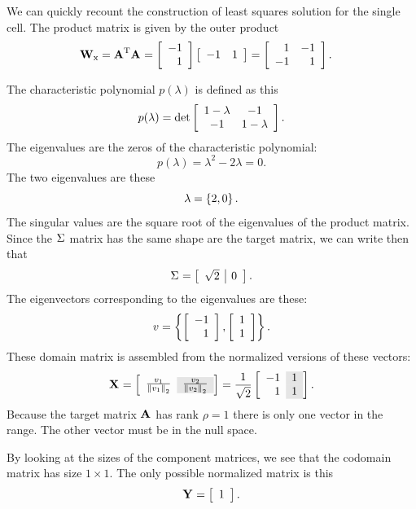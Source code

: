 We can quickly recount the construction of least squares solution for the single cell. The product matrix is given by the outer product
\begin{equation}
  \begin{split}
    \W{x} & = \A{T}\A{} = \mat{r}{-1\\1}\mat{rr}{-1&1} = 
    \mat{rr}{1&-1\\-1&1}.
  \end{split}
\end{equation}

The characteristic polynomial $p(\lambda)$ is defined as this
\begin{equation}
  p(\lambda) = \det
  \mat{cc}{1-\lambda&-1\\-1&1-\lambda}.
\end{equation}
The eigenvalues are the zeros of the characteristic polynomial:
\begin{equation}
  p(\lambda) = \lambda^{2} - 2\lambda = 0.
\end{equation}
The two eigenvalues are these
\begin{equation}
  \lambda = \lst{2,0}.
\end{equation}
The singular values are the square root of the eigenvalues of the product matrix. Since the $\sig{}$ matrix has the same shape are the target matrix, we can write then that
\begin{equation}
  \sig{} = \mat{c|c}{\sqrt{2}&0}.
\end{equation}
The eigenvectors corresponding to the eigenvalues are these:
\begin{equation}
  v = \lst{\mat{r}{-1\\1},\mat{c}{1\\1}}.
\end{equation}
These domain matrix is assembled from the normalized versions of these vectors:
\begin{equation}
  \X{} = 
  \mat{c>{\columncolor{ltgray}}c}{\frac{v_{1}}{\normt{v_{1}}}&\frac{v_{2}}{\normt{v_{2}}}}
  = \stwo 
  \mat{r>{\columncolor{ltgray}}r}{-1&1\\1&1}.
\end{equation}
Because the target matrix $\A{}$ has rank $\rho=1$ there is only one vector in the range. The other vector must be in the null space.

By looking at the sizes of the component matrices, we see that the codomain matrix has size $1\times1$. The only possible normalized matrix is this
\begin{equation}
  \Y{} = \mat{c}{1}.
\end{equation}

